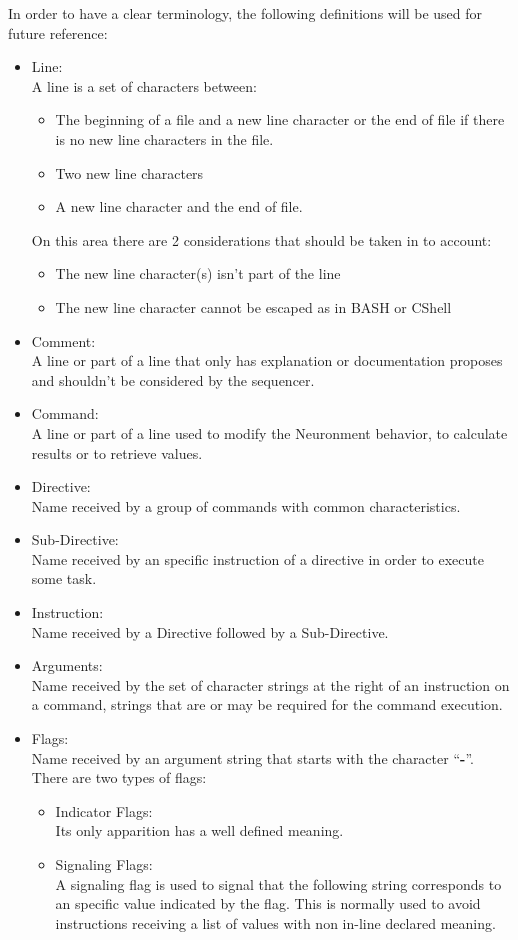 In order to have a clear terminology, the following definitions will be used for future reference:
\begin{itemize}
  \item Line:\\
  A line is a set of characters between:
  \begin{itemize}
    \item The beginning of a file and a new line character or the end of file if there is no new line characters in the file.
    \item Two new line characters
    \item A new line character and the end of file.
  \end{itemize}
  On this area there are 2 considerations that should be taken in to account:
  \begin{itemize}
    \item The new line character(s) isn't part of the line
    \item The new line character cannot be escaped as in BASH or CShell
  \end{itemize}
  \item Comment:\\
  A line or part of a line that only has explanation or documentation proposes and shouldn't be considered by the sequencer.
  \item Command:\\
  A line or part of a line used to modify the Neuronment behavior, to calculate results or to retrieve values.
  \item Directive:\\
  Name received by a group of commands with common characteristics.
  \item Sub-Directive:\\
  Name received by an specific instruction of a directive in order to execute some task.
  \item Instruction:\\
  Name received by a Directive followed by a Sub-Directive.
  \item Arguments:\\
  Name received by the set of character strings at the right of an instruction on a command, strings that are or may be required for the command execution.
  \item Flags:\\
  Name received by an argument string that starts with the character ``\textbf{-}''. There are two types of flags:
  \begin{itemize}
    \item Indicator Flags:\\
    Its only apparition has a well defined meaning.
    \item Signaling Flags:\\
    A signaling flag is used to signal that the following string corresponds to an specific value indicated by the flag. This is normally used to avoid instructions receiving a list of values with non in-line declared meaning.
  \end{itemize}
\end{itemize}

